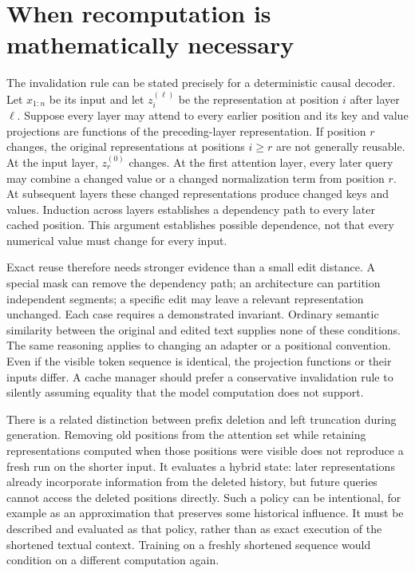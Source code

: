 \section{When recomputation is mathematically necessary}
\label{sec:C04:invalidation}
The invalidation rule can be stated precisely for a deterministic causal decoder. Let $x_{1:n}$ be its input and let $z_i^{(\ell)}$ be the representation at position $i$ after layer $\ell$. Suppose every layer may attend to every earlier position and its key and value projections are functions of the preceding-layer representation. If position $r$ changes, the original representations at positions $i\geq r$ are not generally reusable. At the input layer, $z_r^{(0)}$ changes. At the first attention layer, every later query may combine a changed value or a changed normalization term from position $r$. At subsequent layers these changed representations produce changed keys and values. Induction across layers establishes a dependency path to every later cached position. This argument establishes possible dependence, not that every numerical value must change for every input.

Exact reuse therefore needs stronger evidence than a small edit distance. A special mask can remove the dependency path; an architecture can partition independent segments; a specific edit may leave a relevant representation unchanged. Each case requires a demonstrated invariant. Ordinary semantic similarity between the original and edited text supplies none of these conditions. The same reasoning applies to changing an adapter or a positional convention. Even if the visible token sequence is identical, the projection functions or their inputs differ. A cache manager should prefer a conservative invalidation rule to silently assuming equality that the model computation does not support.

There is a related distinction between prefix deletion and left truncation during generation. Removing old positions from the attention set while retaining representations computed when those positions were visible does not reproduce a fresh run on the shorter input. It evaluates a hybrid state: later representations already incorporate information from the deleted history, but future queries cannot access the deleted positions directly. Such a policy can be intentional, for example as an approximation that preserves some historical influence. It must be described and evaluated as that policy, rather than as exact execution of the shortened textual context. Training on a freshly shortened sequence would condition on a different computation again.

